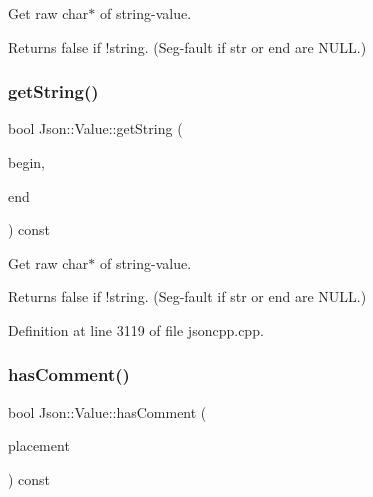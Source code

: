 Get raw char$\ast$ of string-\/value. \begin{DoxyReturn}{Returns}
false if !string. (Seg-\/fault if str or end are N\+U\+LL.) 
\end{DoxyReturn}
\hypertarget{class_json_1_1_value_a2e1b7be6bde2fe23f15290d9ddbbdf8a}{}\label{class_json_1_1_value_a2e1b7be6bde2fe23f15290d9ddbbdf8a} 
\subsubsection{\texorpdfstring{get\+String()}{getString()}\hspace{0.1cm}{\footnotesize\ttfamily [2/2]}}
{\footnotesize\ttfamily bool Json\+::\+Value\+::get\+String (\begin{DoxyParamCaption}\item[{char const $\ast$$\ast$}]{begin,  }\item[{char const $\ast$$\ast$}]{end }\end{DoxyParamCaption}) const}

Get raw char$\ast$ of string-\/value. \begin{DoxyReturn}{Returns}
false if !string. (Seg-\/fault if str or end are N\+U\+LL.) 
\end{DoxyReturn}


Definition at line 3119 of file jsoncpp.\+cpp.

\hypertarget{class_json_1_1_value_a65d8e3ab6a5871cbd019a3e0f0b944a3}{}\label{class_json_1_1_value_a65d8e3ab6a5871cbd019a3e0f0b944a3} 
\subsubsection{\texorpdfstring{has\+Comment()}{hasComment()}\hspace{0.1cm}{\footnotesize\ttfamily [1/2]}}
{\footnotesize\ttfamily bool Json\+::\+Value\+::has\+Comment (\begin{DoxyParamCaption}\item[{\hyperlink{namespace_json_a4fc417c23905b2ae9e2c47d197a45351}{Comment\+Placement}}]{placement }\end{DoxyParamCaption}) const}

\hypertarget{class_json_1_1_value_a65d8e3ab6a5871cbd019a3e0f0b944a3}{}\label{class_json_1_1_value_a65d8e3ab6a5871cbd019a3e0f0b944a3} 
